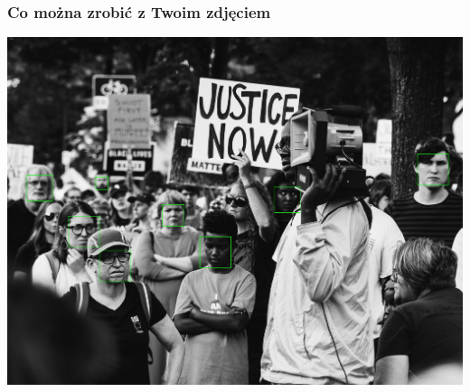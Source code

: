 \documentclass{beamer}
\begin{document}
            \begin{frame}
                \begin{center}
                    \frametitle{Co można zrobić z Twoim zdjęciem}
                    \includegraphics[height=0.8\textheight]{pictures/protest_faces.jpg}
                \end{center}
            \end{frame}
\end{document}
